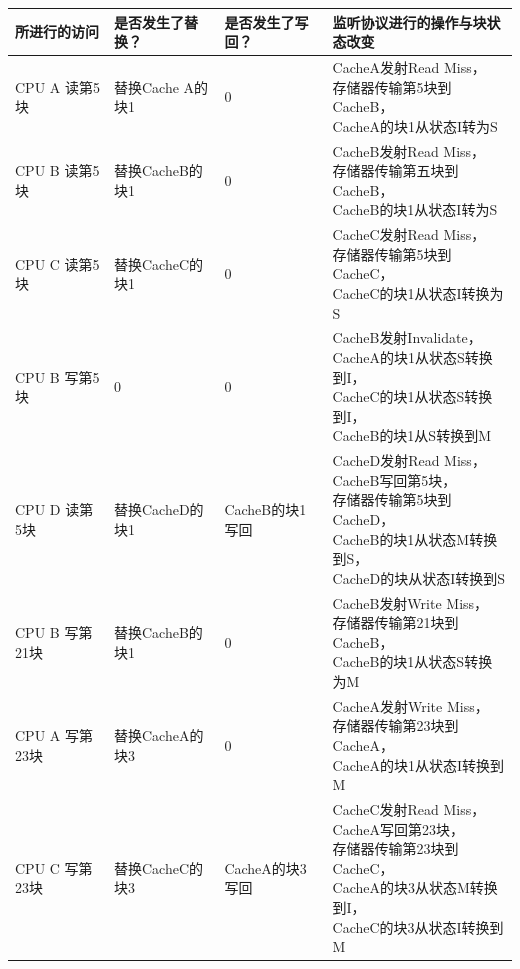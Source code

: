 \documentclass{ctexart}
\makeatletter
\newcommand{\tabincell}[2]{\begin{tabular}{@{}#1@{}}#2\end{tabular}}
\makeatother
\begin{document}
\begin{enumerate}
\begin{longtable}{|l|l|l|l|}
        \endlastfoot
        \hline
        所进行的访问      & 是否发生了替换？     & 是否发生了写回？    & 监听协议进行的操作与块状态改变                                                                     \\ \hline
        CPU A 读第5块  & 替换Cache A的块1 & 0           & \tabincell{l}{CacheA发射Read Miss，\\存储器传输第5块到CacheB，\\CacheA的块1从状态I转为S}                                  \\ \hline
        CPU B 读第5块  & 替换CacheB的块1  & 0           & \tabincell{l}{CacheB发射Read Miss，\\存储器传输第五块到CacheB，\\CacheB的块1从状态I转为S}                                  \\ \hline
        CPU C 读第5块  & 替换CacheC的块1  & 0           & \tabincell{l}{CacheC发射Read Miss，\\存储器传输第5块到CacheC，\\CacheC的块1从状态I转换为S}                               \\ \hline
        CPU B 写第5块  & 0            & 0           & \tabincell{l}{CacheB发射Invalidate，\\CacheA的块1从状态S转换到I，\\CacheC的块1从状态S转换到I，\\CacheB的块1从S转换到M}              \\ \hline
        CPU D 读第5块  & 替换CacheD的块1  & CacheB的块1写回 & \tabincell{l}{CacheD发射Read Miss，\\CacheB写回第5块，\\存储器传输第5块到CacheD，\\CacheB的块1从状态M转换到S，\\CacheD的块从状态I转换到S}    \\ \hline
        CPU B 写第21块 & 替换CacheB的块1  & 0           & \tabincell{l}{CacheB发射Write Miss，\\存储器传输第21块到CacheB，\\CacheB的块1从状态S转换为M}                               \\ \hline
        CPU A 写第23块 & 替换CacheA的块3  & 0           & \tabincell{l}{CacheA发射Write Miss，\\存储器传输第23块到CacheA，\\CacheA的块1从状态I转换到M}                               \\ \hline
        CPU C 写第23块 & 替换CacheC的块3  & CacheA的块3写回 & \tabincell{l}{CacheC发射Read Miss，\\CacheA写回第23块，\\存储器传输第23块到CacheC，\\CacheA的块3从状态M转换到I，\\CacheC的块3从状态I转换到M} \\ \hline

\end{longtable}
\end{enumerate}
\end{document}
